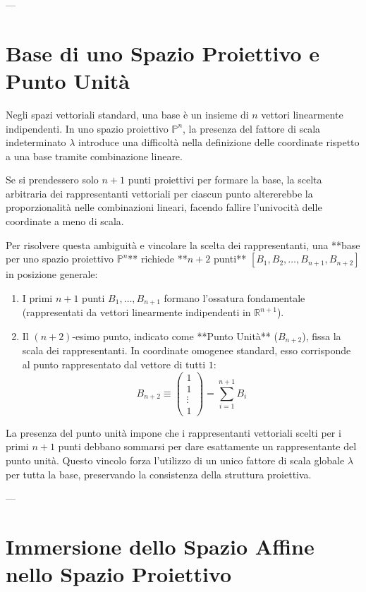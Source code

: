 ---

\section{Base di uno Spazio Proiettivo e Punto Unità}
Negli spazi vettoriali standard, una base è un insieme di $n$ vettori linearmente indipendenti. In uno spazio proiettivo $\mathbb{P}^n$, la presenza del fattore di scala indeterminato $\lambda$ introduce una difficoltà nella definizione delle coordinate rispetto a una base tramite combinazione lineare.

Se si prendessero solo $n+1$ punti proiettivi per formare la base, la scelta arbitraria dei rappresentanti vettoriali per ciascun punto altererebbe la proporzionalità nelle combinazioni lineari, facendo fallire l'univocità delle coordinate a meno di scala.

Per risolvere questa ambiguità e vincolare la scelta dei rappresentanti, una **base per uno spazio proiettivo $\mathbb{P}^n$** richiede **$n+2$ punti** $[B_1, B_2, \dots, B_{n+1}, B_{n+2}]$ in posizione generale:
\begin{enumerate}
    \item I primi $n+1$ punti $B_1, \dots, B_{n+1}$ formano l'ossatura fondamentale (rappresentati da vettori linearmente indipendenti in $\mathbb{R}^{n+1}$).
    \item Il $(n+2)$-esimo punto, indicato come **Punto Unità** ($B_{n+2}$), fissa la scala dei rappresentanti. In coordinate omogenee standard, esso corrisponde al punto rappresentato dal vettore di tutti $1$:
    \begin{equation}
        B_{n+2} \equiv \begin{pmatrix} 1 \\ 1 \\ \vdots \\ 1 \end{pmatrix} = \sum_{i=1}^{n+1} B_i
    \end{equation}
\end{enumerate}

La presenza del punto unità impone che i rappresentanti vettoriali scelti per i primi $n+1$ punti debbano sommarsi per dare esattamente un rappresentante del punto unità. Questo vincolo forza l'utilizzo di un unico fattore di scala globale $\lambda$ per tutta la base, preservando la consistenza della struttura proiettiva.

---

\section{Immersione dello Spazio Affine nello Spazio Proiettivo}

